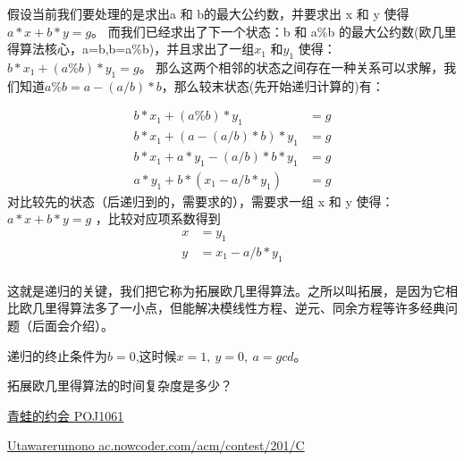 假设当前我们要处理的是求出a 和 b的最大公约数，并要求出 x 和 y 使得 $a * x + b * y=g$。
而我们已经求出了下一个状态：b 和 a\%b 的最大公约数({\heiti 欧几里得算法核心，a=b,b=a\%b})，并且求出了一组$x_1$ 和$y_1$ 使得：$ b * x_1 + (a\%b) * y_1 = g$。
那么这两个相邻的状态之间存在一种关系可以求解，我们知道$a\%b = a - (a/b)*b$，那么较末状态(先开始递归计算的)有：

\begin{align*}
b * x_1 + (a\%b) * y_1 &= g\\
b*x_{1} + (a-(a/b)*b) * y_{1} &= g \\
b*x_{1} + a*y_{1}-(a/b)*b*y_{1} &=g\\
a*y_{1} + b*(x_{1}-a/b*y_{1})&= g
\end{align*}
对比较先的状态（后递归到的，需要求的），需要求一组 x 和 y 使得：$a*x + b*y = g$ ，比较对应项系数得到
\begin{align*}
x &= y_1\\
y &= x_1 - a/b * y_1 \\
\end{align*}


这就是递归的关键，我们把它称为{\heiti 拓展欧几里得算法}。之所以叫拓展，是因为它相比欧几里得算法多了一小点，但能解决模线性方程、逆元、同余方程等许多经典问题（后面会介绍）。

递归的终止条件为$b=0$,这时候$x=1,\ y=0,\ a = gcd$。



\vbox{}

\begin{problemset}
	\item 拓展欧几里得算法的时间复杂度是多少？
	\item \href{http://poj.org/problem?id=1061}{青蛙的约会 \quad POJ1061} 
	\item \href{https://ac.nowcoder.com/acm/contest/201/C}{Utawarerumono \quad ac.nowcoder.com/acm/contest/201/C} 
\end{problemset}










